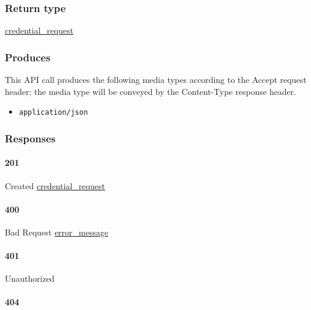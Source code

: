 \hypertarget{return-type-57}{%
\subsubsection{Return type}\label{return-type-57}}

\protect\hyperlink{credential_request}{credential\_request}

\hypertarget{produces-71}{%
\subsubsection{Produces}\label{produces-71}}

This API call produces the following media types according to the
{Accept} request header; the media type will be conveyed by the
{Content-Type} response header.

\begin{itemize}
\tightlist
\item
  \texttt{application/json}
\end{itemize}

\hypertarget{responses-71}{%
\subsubsection{Responses}\label{responses-71}}

\hypertarget{section-235}{%
\paragraph{201}\label{section-235}}

Created \protect\hyperlink{credential_request}{credential\_request}

\hypertarget{section-236}{%
\paragraph{400}\label{section-236}}

Bad Request \protect\hyperlink{error_message}{error\_message}

\hypertarget{section-237}{%
\paragraph{401}\label{section-237}}

Unauthorized \protect\hyperlink{}{}

\hypertarget{section-238}{%
\paragraph{404}\label{section-238}}

